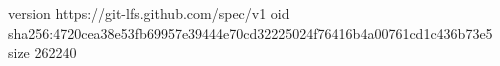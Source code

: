 version https://git-lfs.github.com/spec/v1
oid sha256:4720cea38e53fb69957e39444e70cd32225024f76416b4a00761cd1c436b73e5
size 262240
